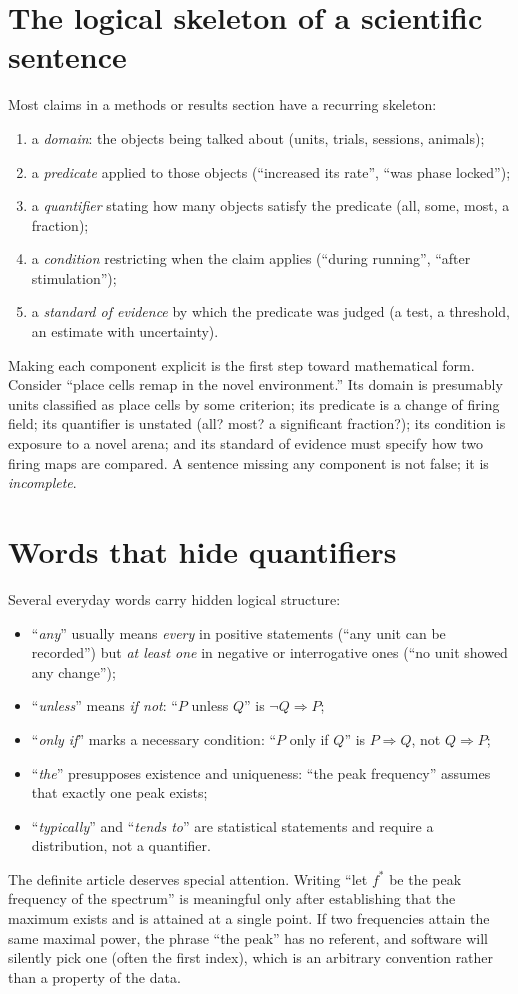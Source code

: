 \section{The logical skeleton of a scientific sentence}
Most claims in a methods or results section have a recurring skeleton:
\begin{enumerate}[leftmargin=2em]
\item a \emph{domain}: the objects being talked about (units, trials, sessions, animals);
\item a \emph{predicate} applied to those objects (``increased its rate'', ``was phase locked'');
\item a \emph{quantifier} stating how many objects satisfy the predicate (all, some, most, a fraction);
\item a \emph{condition} restricting when the claim applies (``during running'', ``after stimulation'');
\item a \emph{standard of evidence} by which the predicate was judged (a test, a threshold, an estimate with uncertainty).
\end{enumerate}
Making each component explicit is the first step toward mathematical form. Consider ``place cells remap in the novel environment.'' Its domain is presumably units classified as place cells by some criterion; its predicate is a change of firing field; its quantifier is unstated (all? most? a significant fraction?); its condition is exposure to a novel arena; and its standard of evidence must specify how two firing maps are compared. A sentence missing any component is not false; it is \emph{incomplete}.

\section{Words that hide quantifiers}
Several everyday words carry hidden logical structure:
\begin{itemize}[leftmargin=2em]
\item ``\emph{any}'' usually means \emph{every} in positive statements (``any unit can be recorded'') but \emph{at least one} in negative or interrogative ones (``no unit showed any change'');
\item ``\emph{unless}'' means \emph{if not}: ``$P$ unless $Q$'' is $\neg Q\Rightarrow P$;
\item ``\emph{only if}'' marks a necessary condition: ``$P$ only if $Q$'' is $P\Rightarrow Q$, not $Q\Rightarrow P$;
\item ``\emph{the}'' presupposes existence and uniqueness: ``the peak frequency'' assumes that exactly one peak exists;
\item ``\emph{typically}'' and ``\emph{tends to}'' are statistical statements and require a distribution, not a quantifier.
\end{itemize}
The definite article deserves special attention. Writing ``let $f^\ast$ be the peak frequency of the spectrum'' is meaningful only after establishing that the maximum exists and is attained at a single point. If two frequencies attain the same maximal power, the phrase ``the peak'' has no referent, and software will silently pick one (often the first index), which is an arbitrary convention rather than a property of the data.

